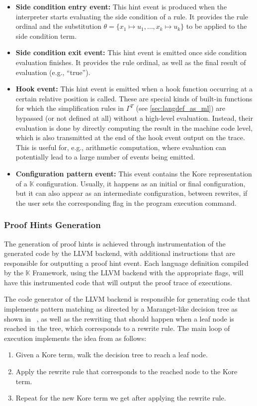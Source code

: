 \documentclass{article}
\theoremstyle{plain}
\theoremstyle{definition}
\newcommand{\K}{$\mathbb{K}$\xspace}
\begin{document}
\begin{itemize}
    \item \textbf{Side condition entry event:} This hint event is produced when the interpreter starts evaluating the side condition of a rule. It provides the rule ordinal and the substitution $\theta = \{x_1\mapsto u_1,\ldots,x_k\mapsto u_k\}$ to be applied to the side condition term.
    \item \textbf{Side condition exit event:} This hint event is emitted once side condition evaluation finishes. It provides the rule ordinal, as well as the final result of evaluation (e.g., “true”).
    \item \textbf{Hook event:} This hint event is emitted when a hook function occurring at a certain relative position is called. These are special kinds of built-in functions for which the simplification rules in $\Gamma^T$ (see \cref{sec:langdef_as_ml}) are bypassed (or not defined at all) without a high-level evaluation. Instead, their evaluation is done by directly computing the result in the machine code level, which is also transmitted at the end of the hook event output on the trace. This is useful for, e.g., arithmetic computation, where evaluation can potentially lead to a large number of events being emitted.
    \item \textbf{Configuration pattern event:} This event contains the Kore representation of a \K configuration. Usually, it happens as an initial or final configuration, but it can also appear as an intermediate configuration, between rewrites, if the user sets the corresponding flag in the program execution command.
\end{itemize}

\subsubsection{Proof Hints Generation}

The generation of proof hints is achieved through instrumentation of the generated code by the LLVM backend, with additional instructions that are responsible for outputting a proof hint event. Each language definition compiled by the \K Framework, using the LLVM backend with the appropriate flags, will have this instrumented code that will output the proof trace of executions.

The code generator of the LLVM backend is responsible for generating code that implements pattern matching as directed by a Maranget-like decision tree as shown in ~\cite{maranget2008,llvm-backend-2025},
as well as the rewriting that should happen when a leaf node is reached in the tree, which corresponds to a rewrite rule. The main loop of execution implements the idea from   as follows:
\begin{enumerate}
    \item Given a Kore term, walk the decision tree to reach a leaf node.
    \item Apply the rewrite rule that corresponds to the reached node to the Kore term.
    \item Repeat for the new Kore term we get after applying the rewrite rule.
\end{enumerate}
\end{document}
